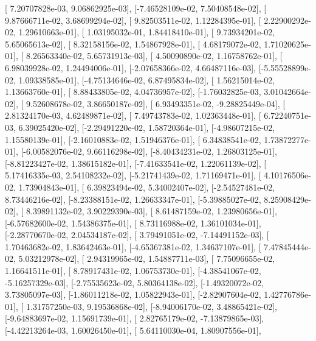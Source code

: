\documentclass{article}
\begin{document}
       [ 7.20707828e-03,  9.06862925e-03],
       [-7.46528109e-02,  7.50408548e-02],
       [ 9.87666711e-02,  3.68699294e-02],
       [ 9.82503511e-02,  1.12284395e-01],
       [ 2.22900292e-02,  1.29610663e-01],
       [ 1.03195032e-01,  1.84418410e-01],
       [ 9.73934201e-02,  5.65065613e-02],
       [ 8.32158156e-02,  1.54867928e-01],
       [ 4.68179072e-02,  1.71020625e-01],
       [ 8.26563340e-02,  5.65731913e-03],
       [ 4.50090890e-02,  1.16758762e-01],
       [ 6.98039928e-02,  1.24494006e-01],
       [-2.07658366e-02,  4.66487116e-03],
       [-5.55528899e-02,  1.09338585e-01],
       [-4.75134646e-02,  6.87495834e-02],
       [ 1.56215014e-02,  1.13663760e-01],
       [ 8.88433805e-02,  4.04736957e-02],
       [-1.76032825e-03,  3.01042664e-02],
       [ 9.52608678e-02,  3.86650187e-02],
       [ 6.93493351e-02, -9.28825449e-04],
       [ 2.81324170e-03,  4.62489871e-02],
       [ 7.49743783e-02,  1.02363448e-01],
       [ 6.72240751e-03,  6.39025420e-02],
       [-2.29491220e-02,  1.58720364e-01],
       [-4.98607215e-02,  1.15580139e-01],
       [-2.16010883e-02,  1.51946376e-01],
       [ 6.34838541e-02,  1.73872277e-01],
       [-6.00582076e-02,  9.66116298e-02],
       [-8.40434231e-02,  1.26803125e-01],
       [-8.81223427e-02,  1.38615182e-01],
       [-7.41633541e-02,  1.22061139e-02],
       [ 5.17416335e-03,  2.54108232e-02],
       [-5.21741439e-02,  1.71169471e-01],
       [ 4.10176506e-02,  1.73904843e-01],
       [ 6.39823494e-02,  5.34002407e-02],
       [-2.54527481e-02,  8.73446216e-02],
       [-8.23388151e-02,  1.26633347e-01],
       [-5.39885027e-02,  8.25908429e-02],
       [ 8.39891132e-02,  3.90229390e-03],
       [ 8.61487159e-02,  1.23980656e-01],
       [-6.57682600e-02,  1.54386375e-01],
       [ 8.73116988e-02,  1.36101034e-01],
       [-2.28770670e-02,  2.04534187e-02],
       [ 3.79491051e-02, -7.14491152e-03],
       [ 1.70463682e-02,  1.83642463e-01],
       [-4.65367381e-02,  1.34637107e-01],
       [ 7.47845444e-02,  5.03212978e-02],
       [ 2.94319965e-02,  1.54887711e-03],
       [ 7.75096655e-02,  1.16641511e-01],
       [ 8.78917431e-02,  1.06753730e-01],
       [-4.38541067e-02, -5.16257329e-03],
       [-2.75535623e-02,  5.80364138e-02],
       [-1.49320072e-02,  3.73805097e-03],
       [-1.86011218e-02,  1.05822943e-01],
       [-2.82907604e-02,  1.42776786e-01],
       [ 1.31757250e-03,  9.19536868e-02],
       [-8.94006170e-02,  3.48865421e-02],
       [-9.64883697e-02,  1.15691739e-01],
       [ 2.82765179e-02, -7.13879865e-03],
       [-4.42213264e-03,  1.60026450e-01],
       [ 5.64110030e-04,  1.80907556e-01],
\end{document}
